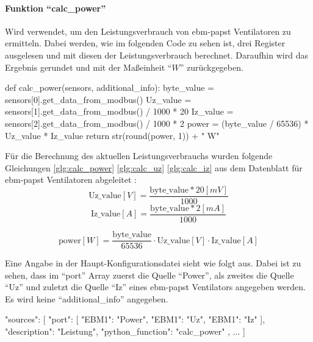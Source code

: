 \paragraph{Funktion \enquote{calc\_power}}
Wird verwendet, um den Leistungsverbrauch von ebm-papst Ventilatoren zu ermitteln. Dabei werden, wie im folgenden Code zu sehen ist, drei Register ausgelesen und mit diesen der Leistungsverbrauch berechnet. Daraufhin wird das Ergebnis gerundet und mit der Maßeinheit \enquote{$W$} zurückgegeben.

\begin{pythoncode}
def calc_power(sensors, additional_info):
	byte_value = sensors[0].get_data_from_modbus()
	Uz_value = sensors[1].get_data_from_modbus() / 1000 * 20
	Iz_value = sensors[2].get_data_from_modbus() / 1000 * 2
	power = (byte_value / 65536) * Uz_value * Iz_value
	return str(round(power, 1)) + " W"
\end{pythoncode}

Für die Berechnung des aktuellen Leistungsverbrauchs wurden folgende Gleichungen \eqref{glg:calc_power} \eqref{glg:calc_uz} \eqref{glg:calc_iz} aus dem Datenblatt für ebm-papst Ventilatoren abgeleitet \cite[vgl.][95,126]{ebmpapst:2020}: 
\begin{equation}
	\text{Uz\_value} \left[V\right] = \frac{\text{byte\_value} * 20 \left[mV\right]}{1000}
	\label{glg:calc_uz}
\end{equation} 
\begin{equation}
	\text{Iz\_value} \left[A\right] = \frac{\text{byte\_value} * 2 \left[mA\right]}{1000}
	\label{glg:calc_iz}
\end{equation} 

\begin{equation}
	\text{power} \left[W\right] = \frac{\text{byte\_value}}{65536} \cdot \text{Uz\_value}  \left[V\right] \cdot \text{Iz\_value} \left[A\right]
	\label{glg:calc_power}
\end{equation} 

Eine Angabe in der Haupt-Konfigurationsdatei sieht wie folgt aus. Dabei ist zu sehen, dass im \enquote{port} Array zuerst die Quelle \enquote{Power}, als zweites die Quelle \enquote{Uz} und zuletzt die Quelle \enquote{Iz} eines ebm-papst Ventilators angegeben werden. Es wird keine \enquote{additional\_info} angegeben.

\begin{jsoncode}
"sources": [
	{
		"port": [
			{"EBM1": "Power"},
			{"EBM1": "Uz"},
			{"EBM1": "Iz"}
		],
		"description": "Leistung",
		"python_function": "calc_power"
	},
	...
]
\end{jsoncode}



